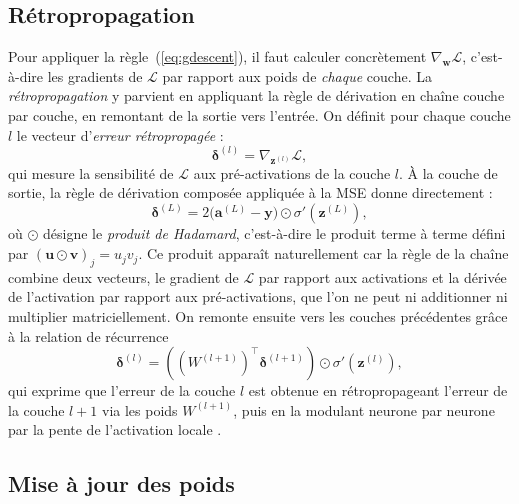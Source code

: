 \documentclass[a4paper,french]{style-LaTeX}
\begin{document}
\subsection*{Rétropropagation}

Pour appliquer la règle~(\ref{eq:gdescent}), il faut calculer concrètement $\nabla_{\mathbf{w}} \mathcal{L}$, c'est-à-dire les gradients de $\mathcal{L}$ par rapport aux poids de \emph{chaque} couche. La \emph{rétropropagation} \cite{Rumelhart86} y parvient en appliquant la règle de dérivation en chaîne couche par couche, en remontant de la sortie vers l'entrée. On définit pour chaque couche $l$ le vecteur d'\emph{erreur rétropropagée} :
\begin{equation}
  \boldsymbol{\delta}^{(l)} = \nabla_{\mathbf{z}^{(l)}} \mathcal{L},
  \label{eq:delta}
\end{equation}
qui mesure la sensibilité de $\mathcal{L}$ aux pré-activations de la couche $l$. À la couche de sortie, la règle de dérivation composée appliquée à la MSE donne directement :
\begin{equation*}
  \boldsymbol{\delta}^{(L)} = 2\bigl(\mathbf{a}^{(L)} - \mathbf{y}\bigr) \odot \sigma'\!\left(\mathbf{z}^{(L)}\right),
\end{equation*}
où $\odot$ désigne le \emph{produit de Hadamard}, c'est-à-dire le produit terme à terme défini par $(\mathbf{u} \odot \mathbf{v})_j = u_j v_j$. Ce produit apparaît naturellement car la règle de la chaîne combine deux vecteurs, le gradient de $\mathcal{L}$ par rapport aux activations et la dérivée de l'activation par rapport aux pré-activations, que l'on ne peut ni additionner ni multiplier matriciellement. On remonte ensuite vers les couches précédentes grâce à la relation de récurrence
\begin{equation}
  \boldsymbol{\delta}^{(l)} = \left( \left(W^{(l+1)}\right)^\top \boldsymbol{\delta}^{(l+1)} \right) \odot \sigma'\!\left(\mathbf{z}^{(l)}\right),
  \label{eq:backprop}
\end{equation}
qui exprime que l'erreur de la couche $l$ est obtenue en rétropropageant l'erreur de la couche $l+1$ via les poids $W^{(l+1)}$, puis en la modulant neurone par neurone par la pente de l'activation locale \cite{Goodfellow16}.

\subsection*{Mise à jour des poids}
\end{document}

